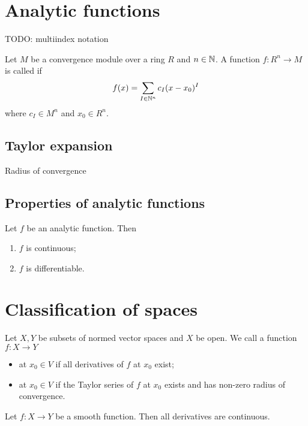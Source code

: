 \section{Analytic functions}
TODO: multiindex notation
\begin{definition}
Let $M$ be a convergence module over a ring $R$ and $n\in\mathbb{N}$. A function $f: R^n\to M$ is called  if
\[ f(x) = \sum_{I\in\mathbb{N}^n}c_I(x-x_0)^I \]
where $c_I\in M^n$ and $x_0\in R^n$.
\end{definition}

\subsection{Taylor expansion}
Radius of convergence

\subsection{Properties of analytic functions}
\begin{proposition}
Let $f$ be an analytic function. Then
\begin{enumerate}
\item $f$ is continuous;
\item $f$ is differentiable.
\end{enumerate}
\end{proposition}

\section{Classification of spaces}
\begin{definition}
Let $X,Y$ be subsets of normed vector spaces and $X$ be open. We call a function $f: X\to Y$
\begin{itemize}
\item {} at $x_0\in V$ if all derivatives of $f$ at $x_0$ exist;
\item {} at $x_0\in V$ if the Taylor series of $f$ at $x_0$ exists and has non-zero radius of convergence.
\end{itemize}
\end{definition}
\begin{lemma}
Let $f: X\to Y$ be a smooth function. Then all derivatives are continuous.
\end{lemma}

